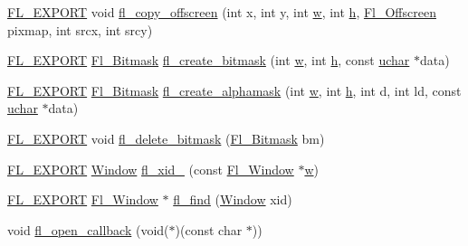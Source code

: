 \begin{DoxyCompactItemize}
\hyperlink{_fl___export_8_h_aa9ba29a18aee9d738370a06eeb4470fc}{F\+L\+\_\+\+E\+X\+P\+O\+RT} void \hyperlink{x_8_h_a14b50a64e4e79330adf03df9a827c161}{fl\+\_\+copy\+\_\+offscreen} (int x, int y, int \hyperlink{forms_8_h_aac374e320caaadeca4874add33b62af2}{w}, int \hyperlink{forms_8_h_a7e427ba5b307f9068129699250690066}{h}, \hyperlink{mac_8_h_ad24d9679e17ea5ffa910ed355d4df340}{Fl\+\_\+\+Offscreen} pixmap, int srcx, int srcy)
\item 
\hyperlink{_fl___export_8_h_aa9ba29a18aee9d738370a06eeb4470fc}{F\+L\+\_\+\+E\+X\+P\+O\+RT} \hyperlink{mac_8_h_a90133b6f8cfb11ab81d83b2c4d91310d}{Fl\+\_\+\+Bitmask} \hyperlink{x_8_h_a5197adda8c1f9ea113311449789720e9}{fl\+\_\+create\+\_\+bitmask} (int \hyperlink{forms_8_h_aac374e320caaadeca4874add33b62af2}{w}, int \hyperlink{forms_8_h_a7e427ba5b307f9068129699250690066}{h}, const \hyperlink{fl__types_8h_a65f85814a8290f9797005d3b28e7e5fc}{uchar} $\ast$data)
\item 
\hyperlink{_fl___export_8_h_aa9ba29a18aee9d738370a06eeb4470fc}{F\+L\+\_\+\+E\+X\+P\+O\+RT} \hyperlink{mac_8_h_a90133b6f8cfb11ab81d83b2c4d91310d}{Fl\+\_\+\+Bitmask} \hyperlink{x_8_h_ae12b3364d68f86e9e920fccc9c0b79e3}{fl\+\_\+create\+\_\+alphamask} (int \hyperlink{forms_8_h_aac374e320caaadeca4874add33b62af2}{w}, int \hyperlink{forms_8_h_a7e427ba5b307f9068129699250690066}{h}, int d, int ld, const \hyperlink{fl__types_8h_a65f85814a8290f9797005d3b28e7e5fc}{uchar} $\ast$data)
\item 
\hyperlink{_fl___export_8_h_aa9ba29a18aee9d738370a06eeb4470fc}{F\+L\+\_\+\+E\+X\+P\+O\+RT} void \hyperlink{x_8_h_a79b34dfedfba622e0626dd5832ca71f2}{fl\+\_\+delete\+\_\+bitmask} (\hyperlink{mac_8_h_a90133b6f8cfb11ab81d83b2c4d91310d}{Fl\+\_\+\+Bitmask} bm)
\item 
\hyperlink{_fl___export_8_h_aa9ba29a18aee9d738370a06eeb4470fc}{F\+L\+\_\+\+E\+X\+P\+O\+RT} \hyperlink{mac_8_h_a213656d363e884b651cc92f58e863fc6}{Window} \hyperlink{x_8_h_a4daabfb0d38b46de684f3d88af173299}{fl\+\_\+xid\+\_\+} (const \hyperlink{class_fl___window}{Fl\+\_\+\+Window} $\ast$\hyperlink{forms_8_h_aac374e320caaadeca4874add33b62af2}{w})
\item 
\hyperlink{_fl___export_8_h_aa9ba29a18aee9d738370a06eeb4470fc}{F\+L\+\_\+\+E\+X\+P\+O\+RT} \hyperlink{class_fl___window}{Fl\+\_\+\+Window} $\ast$ \hyperlink{x_8_h_a4f60f8f2a47f584ee83dd0118a058cfe}{fl\+\_\+find} (\hyperlink{mac_8_h_a213656d363e884b651cc92f58e863fc6}{Window} xid)
\item 
void \hyperlink{group__group__macosx_ga0702a54934d10f5b72157137cf291296}{fl\+\_\+open\+\_\+callback} (void($\ast$)(const char $\ast$))

\end{DoxyCompactItemize}
